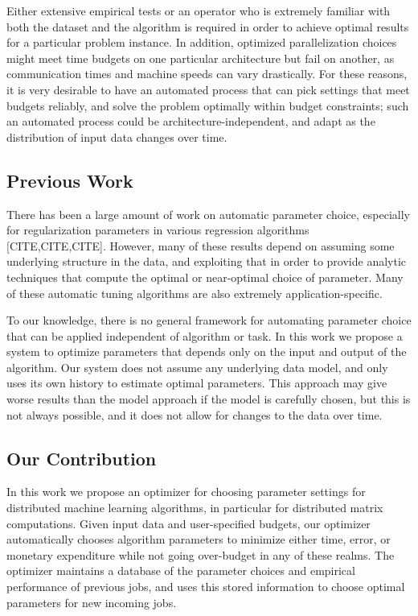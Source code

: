 Either extensive empirical tests or an operator who is extremely 
familiar with both the dataset and the algorithm is required in order 
to achieve optimal results for a particular problem instance. In addition,
optimized parallelization choices might meet time budgets on one particular
architecture but fail on another, as communication times and machine
speeds can vary drastically. For these reasons, it is very desirable 
to have an automated process that can pick settings that meet budgets
reliably, and solve the problem optimally within budget constraints; such
an automated process could be architecture-independent, and adapt 
as the distribution of input data changes over time. 

\subsection{Previous Work}
There has been a large amount of work on automatic parameter choice, 
especially for regularization parameters in various regression algorithms 
[CITE,CITE,CITE]. However, many of these results depend on assuming some 
underlying structure in the data, and exploiting that in order to provide 
analytic techniques that compute the optimal or near-optimal choice of 
parameter. Many of these automatic tuning algorithms are also extremely 
application-specific. 

To our knowledge, there is no general framework for automating parameter 
choice that can be applied independent of algorithm or task. In this work 
we propose a system to optimize parameters that depends only on the input 
and output of the algorithm. Our system does not assume any underlying 
data model, and only uses its own history to estimate optimal parameters. 
This approach may give worse results than the model approach if the model 
is carefully chosen, but this is not always possible, and it does not
allow for changes to the data over time.

\subsection{Our Contribution}
In this work we propose an optimizer for choosing parameter settings for 
distributed machine learning algorithms, in particular for distributed 
matrix computations. Given input data and user-specified budgets, our 
optimizer automatically chooses algorithm parameters to minimize either
time, error, or monetary expenditure while not going over-budget in any 
of these realms. The optimizer maintains a database of the parameter 
choices and empirical performance of previous jobs, and uses this stored 
information to choose optimal parameters for new incoming jobs.


